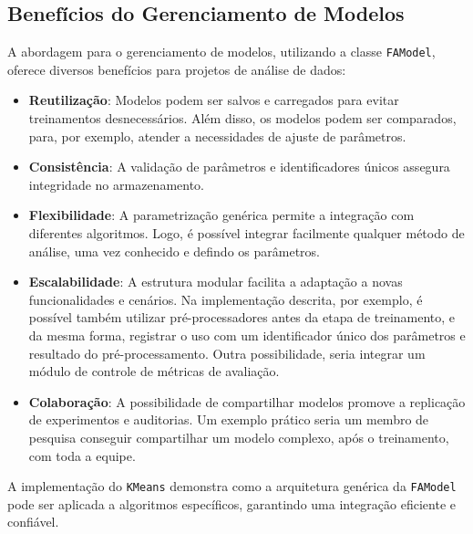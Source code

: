 \subsection{Benefícios do Gerenciamento de Modelos}

A abordagem para o gerenciamento de modelos, utilizando a classe \texttt{FAModel}, oferece diversos benefícios para projetos de análise de dados:

\begin{itemize}
    \item \textbf{Reutilização}: Modelos podem ser salvos e carregados para evitar treinamentos desnecessários. Além disso, os modelos podem ser comparados, para, por exemplo, atender a necessidades de ajuste de parâmetros.
    \item \textbf{Consistência}: A validação de parâmetros e identificadores únicos assegura integridade no armazenamento.
    \item \textbf{Flexibilidade}: A parametrização genérica permite a integração com diferentes algoritmos. Logo, é possível integrar facilmente qualquer método de análise, uma vez conhecido e defindo os parâmetros.
    \item \textbf{Escalabilidade}: A estrutura modular facilita a adaptação a novas funcionalidades e cenários. Na implementação descrita, por exemplo, é possível também utilizar pré-processadores antes da etapa de treinamento, e da mesma forma, registrar o uso com um identificador único dos parâmetros e resultado do pré-processamento. Outra possibilidade, seria integrar um módulo de controle de métricas de avaliação.
    \item \textbf{Colaboração}: A possibilidade de compartilhar modelos promove a replicação de experimentos e auditorias. Um exemplo prático seria um membro de pesquisa conseguir compartilhar um modelo complexo, após o treinamento, com toda a equipe.
\end{itemize}

A implementação do \texttt{KMeans} demonstra como a arquitetura genérica da \texttt{FAModel} pode ser aplicada a algoritmos específicos, garantindo uma integração eficiente e confiável.

\newpage
